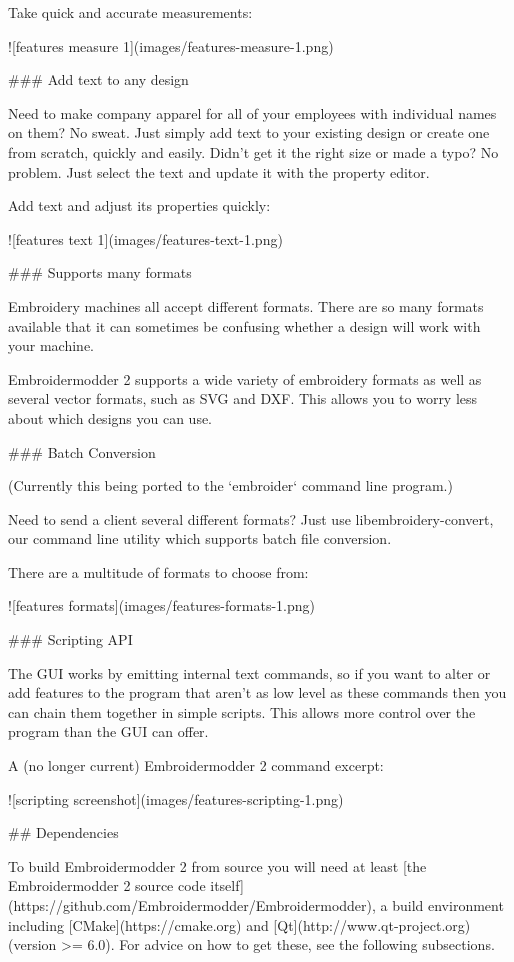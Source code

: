 Take quick and accurate measurements:

![features measure 1](images/features-measure-1.png)

### Add text to any design

Need to make company apparel for all of your employees with individual names on them? No sweat.
Just simply add text to your existing design or create one from scratch, quickly and easily.
Didn't get it the right size or made a typo? No problem. Just select the text and update it
with the property editor.

Add text and adjust its properties quickly:

![features text 1](images/features-text-1.png)

### Supports many formats

Embroidery machines all accept different formats. There are so many formats available that it
can sometimes be confusing whether a design will work with your machine.

Embroidermodder 2 supports a wide variety of embroidery formats as well as several vector
formats, such as SVG and DXF. This allows you to worry less about which designs you can use.

### Batch Conversion

(Currently this being ported to the `embroider` command line program.)

Need to send a client several different formats? Just use libembroidery-convert, our command
line utility which supports batch file conversion.

There are a multitude of formats to choose from:

![features formats](images/features-formats-1.png)

### Scripting API

The GUI works by emitting internal text commands, so if you want to alter
or add features to the program that aren't as low level as these commands then you
can chain them together in simple scripts. This allows more control over the program than
the GUI can offer.

A (no longer current) Embroidermodder 2 command excerpt:

![scripting screenshot](images/features-scripting-1.png)

## Dependencies

To build Embroidermodder 2 from source you will need at least
[the Embroidermodder 2 source code itself](https://github.com/Embroidermodder/Embroidermodder),
a build environment including [CMake](https://cmake.org) and [Qt](http://www.qt-project.org) (version >= 6.0). For advice on how to get these,
see the following subsections.

